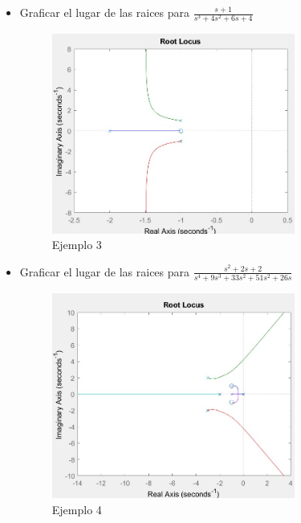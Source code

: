 \documentclass[12pt]{article}
\begin{document}
\begin{itemize}
    \item Graficar el lugar de las raices para $\frac{s+1}{s^3+4s^2+6s+4}$
    
    \begin{figure}[h]
        \centering
            \includegraphics[width=8cm]{IMAGENES/locus3}
            \caption{Ejemplo 3}
    \end{figure}

    \item Graficar el lugar de las raices para $\frac{s^2+2s+2}{s^4+9s^3+33s^2+51s^2+26s}$
    
    \begin{figure}[h]
        \centering
            \includegraphics[width=8cm]{IMAGENES/locus4}
            \caption{Ejemplo 4}
    \end{figure}
\end{itemize}
\end{document}

